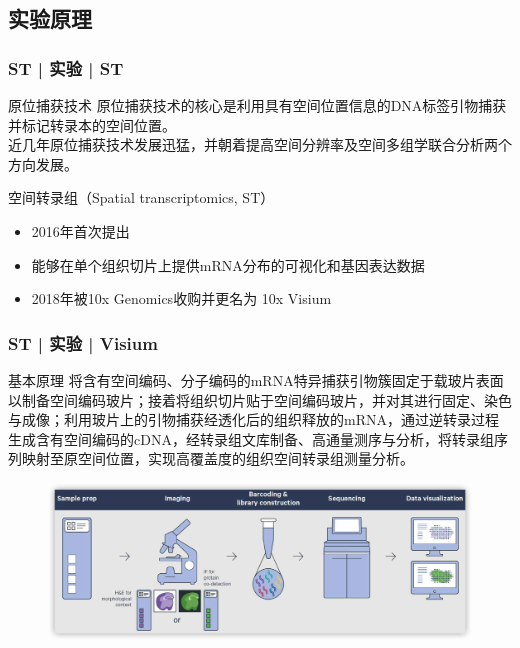 \documentclass[11pt]{ctexbeamer}
\begin{document}
\subsection{实验原理}
\begin{frame}
	\frametitle{ST | 实验 | ST}
	\begin{block}{原位捕获技术}
		原位捕获技术的核心是利用具有空间位置信息的DNA标签引物捕获并标记转录本的空间位置。\\
		近几年原位捕获技术发展迅猛，并朝着\alert{提高空间分辨率及空间多组学联合分析}两个方向发展。
		\end{block}
		\begin{block}{空间转录组（Spatial transcriptomics, ST）}
       \begin{itemize}
       	\item 2016年首次提出
       	\item 能够在单个组织切片上提供mRNA分布的可视化和基因表达数据
       	\item 2018年被10x Genomics收购并更名为 \alert{10x Visium}
       \end{itemize}
	\end{block}
\end{frame}

\begin{frame}
	\frametitle{ST | 实验 | Visium}
		\begin{block}{基本原理}
			将含有空间编码、分子编码的mRNA特异捕获引物簇固定于载玻片表面以制备空间编码玻片；接着将组织切片贴于空间编码玻片，并对其进行固定、染色与成像；利用玻片上的引物捕获经透化后的组织释放的mRNA，通过逆转录过程生成含有空间编码的cDNA，经转录组文库制备、高通量测序与分析，将转录组序列映射至原空间位置，实现高覆盖度的组织空间转录组测量分析。
	\end{block}
\vspace{-0.6em}
		\begin{figure}
	\includegraphics[width=\textwidth]{ST_workflow_08.png}
\end{figure}
\end{frame}
\end{document}
